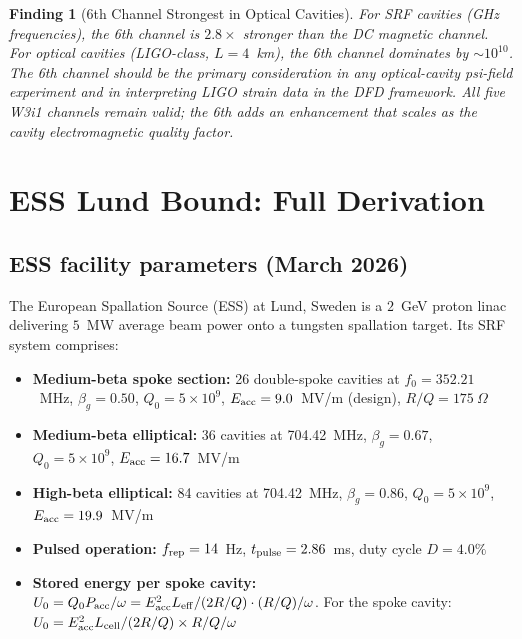 \documentclass[11pt,twocolumn]{article}
\newcommand{\ee}[1]{\times 10^{#1}}
\newtheorem{finding}{Finding}[section]
\begin{document}
\begin{finding}[6th Channel Strongest in Optical Cavities]
\label{find:sixth_optical}
For SRF cavities (GHz frequencies), the 6th channel is $2.8\times$
stronger than the DC magnetic channel. For optical cavities (LIGO-class,
$L = 4$~km), the 6th channel dominates by $\sim 10^{10}$. The 6th
channel should be the primary consideration in any optical-cavity
psi-field experiment and in interpreting LIGO strain data in the DFD
framework. All five W3i1 channels remain valid; the 6th adds an
enhancement that scales as the cavity electromagnetic quality factor.
\end{finding}


\section{ESS Lund Bound: Full Derivation}
\label{sec:ess_derivation}

\subsection{ESS facility parameters (March 2026)}

The European Spallation Source (ESS) at Lund, Sweden is a $2$~GeV
proton linac delivering $5$~MW average beam power onto a tungsten
spallation target. Its SRF system comprises:

\begin{itemize}[nosep]
\item \textbf{Medium-beta spoke section:} 26 double-spoke cavities
  at $f_0 = 352.21$~MHz, $\beta_g = 0.50$, $Q_0 = 5\ee{9}$,
  $E_{\rm acc} = 9.0$~MV/m (design), $R/Q = 175~\Omega$
\item \textbf{Medium-beta elliptical:} 36 cavities at 704.42~MHz,
  $\beta_g = 0.67$, $Q_0 = 5\ee{9}$, $E_{\rm acc} = 16.7$~MV/m
\item \textbf{High-beta elliptical:} 84 cavities at 704.42~MHz,
  $\beta_g = 0.86$, $Q_0 = 5\ee{9}$, $E_{\rm acc} = 19.9$~MV/m
\item \textbf{Pulsed operation:} $f_{\rm rep} = 14$~Hz,
  $t_{\rm pulse} = 2.86$~ms, duty cycle $D = 4.0\%$
\item \textbf{Stored energy per spoke cavity:}
  $U_0 = Q_0 P_{\rm acc} / \omega = E_{\rm acc}^2 L_{\rm eff}/(2R/Q)
  \cdot (R/Q)/\omega$. For the spoke cavity:
  $U_0 = E_{\rm acc}^2 L_{\rm cell}/(2R/Q)\times R/Q/\omega$
\end{itemize}
\end{document}

